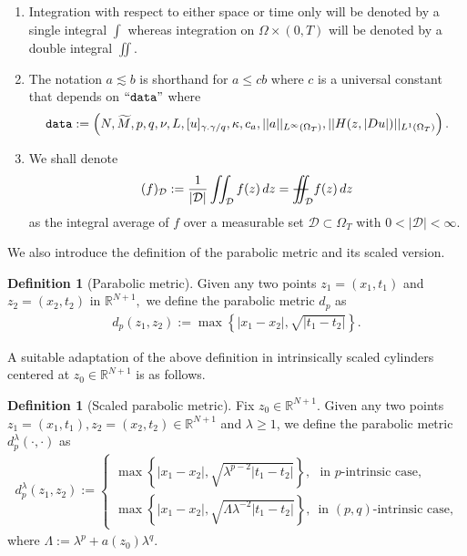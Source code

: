 \documentclass[notitlepage,11pt,reqno]{amsart}
\theoremstyle{definition}
\newtheorem{definition}[theorem]{Definition}
\numberwithin{equation}{section}
\newcommand{\la}{\lambda}
\newcommand{\La}{\Lambda}
\newcommand{\RR}{\mathds{R}}
\newcommand{\iintss}{{\int\hspace{-0.28cm}\int}}
\newcommand{ \miints }{{\iintss\hspace{-0.56cm} -\hspace{-0.15cm}-}}
\newcommand{\miint}[1]{{\miints_{\hspace{-0.13cm}#1}}}
\begin{document}
\begin{enumerate}[label=(\roman*),series=theoremconditions]
\item\label{not7} Integration with respect to either space or time only will be denoted by a single integral $\int$ whereas integration on $\Omega\times (0, T)$ will be denoted by a double integral $\iint$. 
	
	\item\label{not9} The notation $a \lesssim b$ is shorthand for $a\leq c b$ where $c$ is a universal constant that depends on $``\text{\texttt{data}}"$ where 
 \begin{align*}
\text{\texttt{\texttt{data}}}:=\left(N, \widetilde M, p, q, \nu, L, [u]_{\gamma. \gamma/q}, \kappa, c_a, ||a||_{L^{\infty}(\Omega_T)}, ||H(z, |D u|)||_{L^1(\Omega_T)}\right).
 \end{align*}

 \item \label{integral avarage} We shall denote
 \begin{align*}
     (f)_{\mathcal{D}}:= \frac{1}{|\mathcal{D}|}\iint_{\mathcal{D}} f(z)\, dz= \miint{\mathcal{D}} f(z)\, dz
 \end{align*}
 as the integral average of $f$ over a measurable set $\mathcal{D} \subset \Omega_T$ with $0<|\mathcal{D}|<\infty.$ 

 \end{enumerate}
 We also introduce the definition of the parabolic metric and its scaled version.
\begin{definition}[Parabolic metric]\label{parabolic metric}
Given any two points $z_1=(x_1, t_1)$ and $z_2=(x_2, t_2)$ in $\RR^{N+1},$ we define the parabolic metric $d_p$ as 
\begin{align*}
d_p(z_1, z_2):=\max\left\{|x_1-x_2|, \sqrt{|t_1-t_2|}\right\}.
\end{align*}
\end{definition}
A suitable adaptation of the above definition in intrinsically scaled cylinders centered at $z_0\in \RR^{N+1}$ is as follows.
\begin{definition}[Scaled parabolic metric]\label{para metric}
Fix $z_0 \in \RR^{N+1}.$ Given any two points $z_1=(x_1, t_1), z_2=(x_2, t_2) \in \RR^{N+1}$ and $\lambda\geq 1$, we define the parabolic metric $d^{\la}_{p}(\cdot, \cdot)$ as
\begin{align*}
\displaystyle
d^{\la}_{p}(z_1,z_2):=\left\{\begin{array}{l}
\max\left\{|x_1-x_2|, \sqrt{\lambda^{p-2}|t_1-t_2|}\right\}, \,\,\,\,\text{in $p$-intrinsic case,}\\
\max\left\{|x_1-x_2|, \sqrt{\Lambda \lambda^{-2}|t_1-t_2|}\right\},\,\,\,\text{in $(p,q)$-intrinsic case,}
\end{array}\right.
\end{align*}
where $\La:=\la^p+a(z_0)\la^q.$   
\end{definition}
\end{document}
